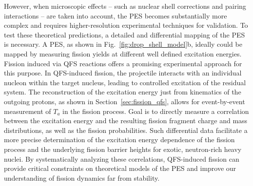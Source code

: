 However, when microscopic effects -- such as nuclear shell corrections and pairing interactions -- are taken into account, the PES becomes substantially more complex and requires higher-resolution experimental techniques for validation.\newline
To test these theoretical predictions, a detailed and differential mapping of the PES is necessary. A PES, as shown in Fig.~\ref{fig:drop_shell_model}b, ideally could be mapped by measuring fission yields at different well defined excitation energies.\newline
Fission induced via QFS reactions offers a promising experimental approach for this purpose. In QFS-induced fission, the projectile interacts with an individual nucleon within the target nucleus, leading to controlled excitation of the residual system. The reconstruction of the excitation energy just from kinematics of the outgoing protons, as shown in Section~\ref{sec:fission_qfs}, allows for event-by-event measurement of $T_a$ in the fission process. Goal is to directly measure a correlation between the excitation energy and the resulting fission fragment charge and mass distributions, as well as the fission probabilities.\newline
Such differential data facilitate a more precise determination of the excitation energy dependence of the fission process and the underlying fission barrier heights for exotic, neutron-rich heavy nuclei. By systematically analyzing these correlations, QFS-induced fission can provide critical constraints on theoretical models of the PES and improve our understanding of fission dynamics far from stability.\newline

\clearpage
